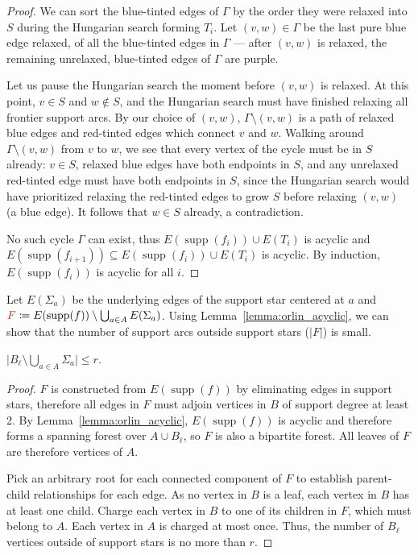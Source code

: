 \documentclass[a4paper,UKenglish]{socg-lipics-v2018}
\makeatletter
\def\abs#1{\mathopen| #1 \mathclose|}		%
\def\supp{\operatorname{supp}}
\theoremstyle{plain}
\numberwithin{figure}{section}
\def\EMPH#1{\textcolor{BrickRed}{{\emph{#1}}}}
\def\n@te#1{\textsf{\boldmath \textbf{$\langle\!\langle$#1$\rangle\!\rangle$}}\leavevmode}
\def\note#1{\textcolor{red}{\n@te{#1}}}
\renewcommand{\note}[1]{} %
\makeatother
\begin{document}
\begin{toappendix}
\begin{proof}
We can sort the blue-tinted edges of $\Gamma$ by the order they were relaxed
into $S$ during the Hungarian search forming $T_i$.
Let $(v, w) \in \Gamma$ be the last pure blue edge relaxed, of all the
blue-tinted edges in $\Gamma$ --- after $(v, w)$ is relaxed, the remaining
unrelaxed, blue-tinted edges of $\Gamma$ are purple.

Let us pause the Hungarian search the moment before $(v, w)$ is relaxed.
At this point, $v \in S$ and $w \not\in S$, and the Hungarian search must have
finished relaxing all frontier support arcs.
By our choice of $(v, w)$, $\Gamma \setminus (v, w)$ is a path of relaxed blue
edges and red-tinted edges which connect $v$ and $w$.
Walking around $\Gamma \setminus (v, w)$ from $v$ to $w$, we see that every
vertex of the cycle must be in $S$ already: $v \in S$, relaxed blue edges have
both endpoints in $S$, and any unrelaxed red-tinted edge must have both
endpoints in $S$, since the Hungarian search would have prioritized relaxing
the red-tinted edges to grow $S$ before relaxing $(v, w)$ (a blue edge).
It follows that $w \in S$ already, a contradiction.

No such cycle $\Gamma$ can exist, thus $E(\supp(f_i)) \cup E(T_i)$ is acyclic
and $E(\supp(f_{i+1})) \subseteq E(\supp(f_i)) \cup E(T_i)$ is acyclic.
By induction, $E(\supp(f_i))$ is acyclic for all $i$.
\end{proof}

Let \EMPH{$E(\Sigma_a)$} \note{only used once} be the underlying edges of the support star centered
at $a$ and $\EMPH{$F$} \coloneqq E(\supp(f)) \setminus \bigcup_{a \in A} E(\Sigma_a)$.
Using Lemma~\ref{lemma:orlin_acyclic}, we can show that the number of support
arcs outside support stars ($\abs{F}$) is small.

\begin{lemmarep}
\label{lemma:no_star_support_size}
$\abs{B_\ell \setminus \bigcup_{a \in A} \Sigma_a} \leq r$.
\end{lemmarep}

\begin{proof}
$F$ is constructed from $E(\supp(f))$ by eliminating edges in support stars,
therefore all edges in $F$ must adjoin vertices in $B$ of support degree at
least 2.
By Lemma~\ref{lemma:orlin_acyclic}, $E(\supp(f))$ is acyclic and therefore forms
a spanning forest over $A \cup B_\ell$, so $F$ is also a bipartite forest.
All leaves of $F$ are therefore vertices of $A$.

Pick an arbitrary root for each connected component of $F$ to establish
parent-child relationships for each edge.
As no vertex in $B$ is a leaf, each vertex in $B$ has at least one child.
Charge each vertex in $B$ to one of its children in $F$, which must belong to $A$.
Each vertex in $A$ is charged at most once.
Thus, the number of $B_\ell$ vertices outside of support stars is no more than $r$.
\end{proof}

\end{toappendix}
\end{document}

